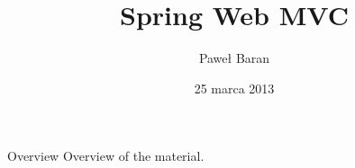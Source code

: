 \documentclass{beamer}
\title[Spring Web MVC]{Spring Web MVC}
\author[P. Baran]{Paweł Baran}
\institute[Javart]{
      Javart Sp. z o. o.\\
        }
\date[Marzec 2013]{25 marca 2013}
\begin{document}
\begin{frame}[plain]
    \titlepage
\end{frame}

\begin{frame}{Overview}
    Overview of the material.
\end{frame}
\end{document}
